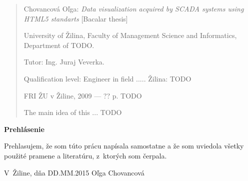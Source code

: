 

\begin{abstract}

\noindent
{\sc Chovancová Oľga:} {\em Data visualization acquired by SCADA systems using HTML5 standarts}
[Bacalar thesis] 

\noindent
University of Žilina,  
Faculty of Management Science and Informatics, 
Department of TODO.
 
\noindent
Tutor:  Ing. Juraj Veverka. 
 
\noindent
Qualification level:
Engineer in field ..... Žilina: TODO

\noindent
FRI ŽU v Žiline, 2009 --- ?? p. TODO

\bigskip

The main idea of this ... TODO

\end{abstract}


\newpage

\centerline{\bf Prehlásenie}

\vspace{2em}

\noindent
Prehlasujem, že som túto prácu napísala samostatne a že som uviedola
všetky použité pramene a literatúru, z~ktorých som čerpala. 

\vspace{2em}

\noindent
V~Žiline, dňa DD.MM.2015
\hfill
Oľga Chovancová
